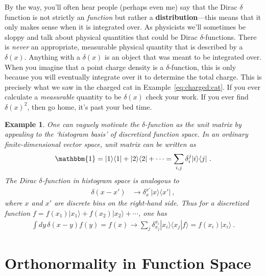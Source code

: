 \documentclass[
  11pt,
	colorful,
	raggedright,
]{tufte-style-thesis-flip}
\newtheorem{example}{Example}[section]
\begin{document}
By the way, you'll often hear people (perhaps even me) say that the Dirac $\delta$ function is not strictly an \emph{function} but rather a \textbf{distribution}---this means that it only makes sense when it is integrated over. As physicists we'll sometimes be sloppy and talk about physical quantities that could be Dirac $\delta$-functions. There is \emph{never} an appropriate, measurable physical quantity that is described by a $\delta(x)$. Anything with a $\delta(x)$ is an object that was meant to be integrated over. When you imagine that a point charge density is a $\delta$-function, this is only because you will eventually integrate over it to determine the total charge. This is precisely what we saw in the charged cat in Example~\ref{eq:charged:cat}. If you ever calculate a \emph{measurable} quantity to be $\delta(x)$ check your work. If you ever find $\delta(x)^2$, then go home, it's past your bed time.

\begin{example}
One can vaguely motivate the $\delta$-function as the unit matrix by appealing to the `histogram basis' of discretized function space. In an ordinary finite-dimensional vector space, unit matrix can be written as
\begin{align}
  \mathbbm{1} = |1\rangle\langle 1 | + |2\rangle\langle 2 | + \cdots
  = \sum_{i,j}\delta_{i}^j|i\rangle\langle j| \ .
\end{align}
The Dirac $\delta$-function in histogram space is analogous to
\begin{align}
  \delta(x-x') &\to \delta_{x}^{x'}|x\rangle\langle x'| \ ,
\end{align}
where $x$ and $x'$ are discrete bins on the right-hand side. Thus for a discretized function $f = f(x_1)|x_1\rangle + f(x_2)|x_2\rangle + \cdots$, one has
\begin{align}
  \int dy\, \delta(x-y) f(y) = f(x) \longrightarrow \sum_j \delta_{x_j}^{x_i}|x_i\rangle\langle x_j| f\rangle  =  f(x_i) |x_i\rangle\ .
\end{align}
\end{example}

\section{Orthonormality in Function Space}
\end{document}
